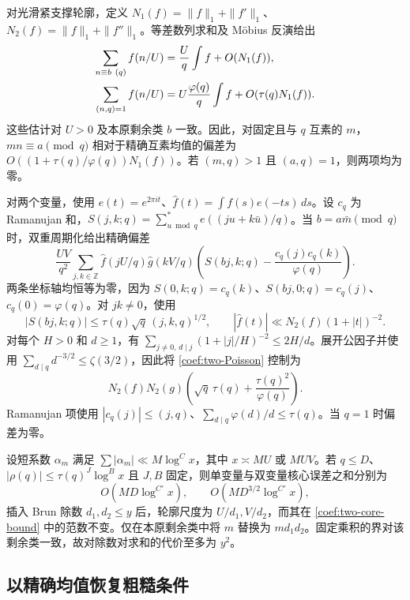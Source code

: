 对光滑紧支撑轮廓，定义 $N_1(f)=\|f\|_1+\|f'\|_1$、$N_2(f)=\|f\|_1+\|f''\|_1$。等差数列求和及 M\"obius 反演给出
\begin{align}
 \sum_{n\equiv b\ (q)}f(n/U)&=\frac Uq\int f+O(N_1(f)),\notag\\
 \sum_{(n,q)=1}f(n/U)&=U\frac{\varphi(q)}q\int f
                        +O(\tau(q)N_1(f)).
 \label{coef:one-core}
\end{align}
这些估计对 $U>0$ 及本原剩余类 $b$ 一致。因此，对固定且与 $q$ 互素的 $m$，$mn\equiv a\pmod q$ 相对于精确互素均值的偏差为 $O((1+\tau(q)/\varphi(q))N_1(f))$。若 $(m,q)>1$ 且 $(a,q)=1$，则两项均为零。

对两个变量，使用 $e(t)=e^{2\pi it}$、$\widehat f(t)=\int f(s)e(-ts)\,ds$。设 $c_q$ 为 Ramanujan 和，$S(j,k;q)=\sum_{u\bmod q}^{*}e((ju+k\bar u)/q)$。当 $b=a\bar m\pmod q$ 时，双重周期化给出精确偏差
\begin{equation}
 \frac{UV}{q^2}\sum_{j,k\in\mathbb Z}
 \widehat f(jU/q)\widehat g(kV/q)
 \left(S(bj,k;q)-\frac{c_q(j)c_q(k)}{\varphi(q)}\right).
 \label{coef:two-Poisson}
\end{equation}
两条坐标轴均恒等为零，因为 $S(0,k;q)=c_q(k)$、$S(bj,0;q)=c_q(j)$、$c_q(0)=\varphi(q)$。对 $jk\ne0$，使用
\[
 |S(bj,k;q)|\le\tau(q)\sqrt q\,(j,k,q)^{1/2},\qquad
 |\widehat f(t)|\ll N_2(f)(1+|t|)^{-2}.
\]
对每个 $H>0$ 和 $d\ge1$，有 $\sum_{j\ne0,\,d\mid j}(1+|j|/H)^{-2}\le2H/d$。展开公因子并使用 $\sum_{d\mid q}d^{-3/2}\le\zeta(3/2)$，因此将 \eqref{coef:two-Poisson} 控制为
\begin{equation}
 N_2(f)N_2(g)
 \left(\sqrt q\,\tau(q)+\frac{\tau(q)^2}{\varphi(q)}\right).
 \label{coef:two-core-bound}
\end{equation}
Ramanujan 项使用 $|c_q(j)|\le(j,q)$、$\sum_{d\mid q}\varphi(d)/d\le\tau(q)$。当 $q=1$ 时偏差为零。

设短系数 $\alpha_m$ 满足 $\sum|\alpha_m|\ll M\log^C x$，其中 $x\asymp MU$ 或 $MUV$。若 $q\le D$、$|\rho(q)|\le\tau(q)^J\log^B x$ 且 $J,B$ 固定，则单变量与双变量核心误差之和分别为
\begin{equation}
 O(MD\log^{C'}x),\qquad O(MD^{3/2}\log^{C'}x),
 \label{coef:core-summed}
\end{equation}
插入 Brun 除数 $d_1,d_2\le y$ 后，轮廓尺度为 $U/d_1,V/d_2$，而其在 \eqref{coef:two-core-bound} 中的范数不变。仅在本原剩余类中将 $m$ 替换为 $md_1d_2$。固定乘积的界对该剩余类一致，故对除数对求和的代价至多为 $y^2$。

\subsection{以精确均值恢复粗糙条件}

